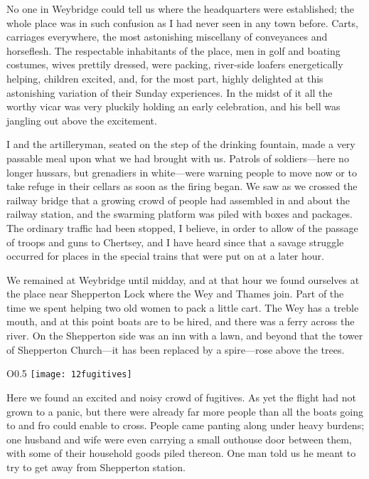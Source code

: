No one in Weybridge could tell us where the headquarters were established; the whole place was in such confusion as I had never seen in any town before. Carts, carriages everywhere, the most astonishing miscellany of conveyances and horseflesh. The respectable inhabitants of the place, men in golf and boating costumes, wives prettily dressed, were packing, river-side loafers energetically helping, children excited, and, for the most part, highly delighted at this astonishing variation of their Sunday experiences. In the midst of it all the worthy vicar was very pluckily holding an early celebration, and his bell was jangling out above the excitement.

I and the artilleryman, seated on the step of the drinking fountain, made a very passable meal upon what we had brought with us. Patrols of soldiers—here no longer hussars, but grenadiers in white—were warning people to move now or to take refuge in their cellars as soon as the firing began. We saw as we crossed the railway bridge that a growing crowd of people had assembled in and about the railway station, and the swarming platform was piled with boxes and packages. The ordinary traffic had been stopped, I believe, in order to allow of the passage of troops and guns to Chertsey, and I have heard since that a savage struggle occurred for places in the special trains that were put on at a later hour.

We remained at Weybridge until midday, and at that hour we found ourselves at the place near Shepperton Lock where the Wey and Thames join. Part of the time we spent helping two old women to pack a little cart. The Wey has a treble mouth, and at this point boats are to be hired, and there was a ferry across the river. On the Shepperton side was an inn with a lawn, and beyond that the tower of Shepperton Church—it has been replaced by a spire—rose above the trees.

\begin{wrapfigure}{O}{0.5\textwidth}
\centering
\texttt{[image: 12fugitives]}
\end{wrapfigure}

Here we found an excited and noisy crowd of fugitives. As yet the flight had not grown to a panic, but there were already far more people than all the boats going to and fro could enable to cross. People came panting along under heavy burdens; one husband and wife were even carrying a small outhouse door between them, with some of their household goods piled thereon. One man told us he meant to try to get away from Shepperton station.

